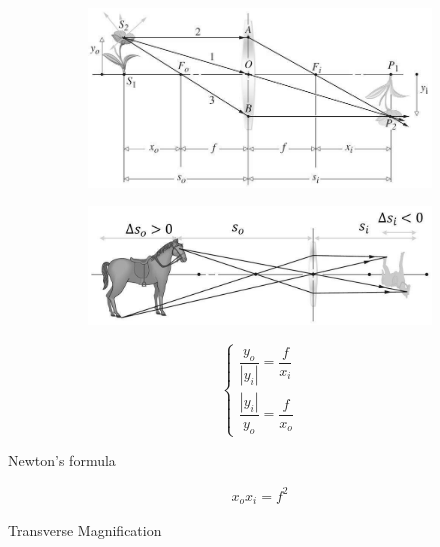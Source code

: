 \begin{figure}[H]
  \centering
  \begin{subfigure}{.5\textwidth}
    \centering
      \includegraphics[width=\linewidth]{figures/Magnification-transverse.jpg}
    \label{fig:}
  \end{subfigure}%
  \begin{subfigure}{.5\textwidth}
    \centering
      \includegraphics[width=\linewidth]{figures/Magnification-longitudinal.jpg}
    \label{fig:}
  \end{subfigure}
  \label{fig:}
\end{figure}


\begin{equation*}
  \left\{
  \begin{aligned}
    \dfrac{y_o}{|y_i|} = \dfrac{f}{x_i} \\
    \dfrac{|y_i|}{y_o} = \dfrac{f}{x_o}  
  \end{aligned}
  \right.
\end{equation*}

Newton's formula

\begin{equation*}
  \begin{aligned}
    x_o x_i = f^2
  \end{aligned}
\end{equation*}


Transverse Magnification

